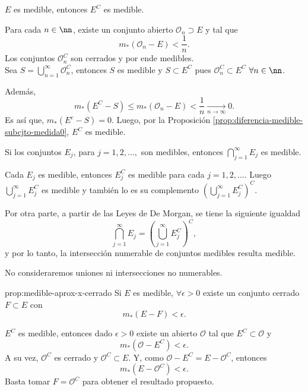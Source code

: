 \begin{proposicion}{}
$E$ es medible, entonces $E^C$ es medible.
\end{proposicion}

\begin{demo}{}
Para cada $n \in \nn$, existe un conjunto abierto $\mathcal{O}_n \supset E$ y tal que 
\[
m_{*}(\mathcal{O}_n-E)<\frac{1}{n}.
\]
Los conjuntos $\mathcal{O}_n^C$ son cerrados y por ende medibles. \\
Sea $S=\bigcup\limits_{n=1}^{\infty} \mathcal{O}_n^C$, entonces $S$ es medible y $S\subset E^C$ pues $\mathcal{O}_n^C \subset E^C$ $\forall n\in \nn$.

Adem\'as, 
\[
m_{*}(E^C-S)\leq m_{*}(\mathcal{O}_n-E)<\frac{1}{n} \xrightarrow[ n \to \infty]{} 0.
\]
Es as\'i que,   $m_{*}(E^c-S)=0$. Luego,  por la Proposici\'on \ref{prop:diferencia-medible-subcjto-medida0}, $E^C$ es medible.
\end{demo}

\begin{proposicion}{}
Si los conjuntos $E_j$, para $j=1,2,\ldots,$ son medibles, entonces
$\bigcap\limits_{j=1}^{\infty}E_j$ es medible.
\end{proposicion}

\begin{demo}
Cada $E_j$ es medible, entonces $E_j^C$ es medible para cada $j=1,2,\ldots$. Luego $\bigcup\limits_{j=1}^{\infty} E_j^C$ es medible y tambi\'en lo es su complemento 
$ \left(\bigcup\limits_{j=1}^{\infty} E_j^C\right)^C$.

Por otra parte,  a partir de las Leyes de De Morgan, se tiene la siguiente igualdad
\[
\bigcap\limits_{j=1}^{\infty}E_j= 
\left( \bigcup\limits_{j=1}^{\infty} E_j^C\right)^C,
\]
y por lo tanto, la intersecci\'on numerable de conjuntos medibles  resulta medible.
\end{demo}


No consideraremos uniones ni intersecciones no numerables.

\begin{proposicion}{prop:medible-aprox-x-cerrado}
Si $E$ es medible, $\forall \epsilon>0$ existe un conjunto cerrado $F\subset E$ con
\[
m_{*}(E-F)<\epsilon.
\]
\end{proposicion}

\begin{demo}
$E^C$ es medible, entonces dado $\epsilon>0$ existe un abierto $\mathcal{O}$ tal que $E^C \subset \mathcal{O}$ y 
\[
m_{*}(\mathcal{O}-E^C)<\epsilon.
\]
A su vez, $\mathcal{O}^C$ es cerrado y $\mathcal{O}^C\subset E$. 
Y, como $\mathcal{O}-E^C=E-\mathcal{O}^C$, entonces
\[
m_{*}(E-\mathcal{O}^C)<\epsilon.
\]
Basta tomar $F=\mathcal{O}^C$ para obtener el resultado propuesto.
\end{demo}

